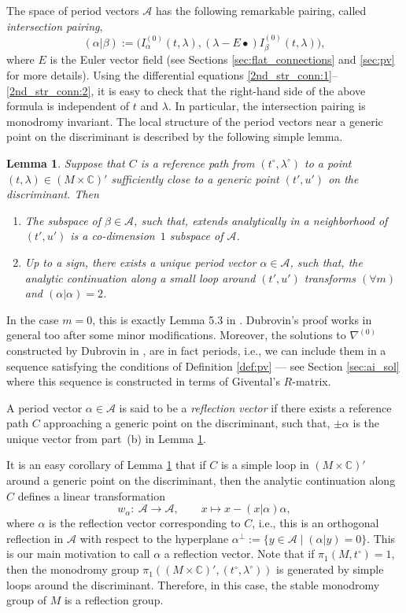 \documentclass[pdftex]{sigma}
\numberwithin{equation}{section}
\newtheorem{Lemma}[Theorem]{Lemma}
\newcommand{\CC}{\mathbb{C}}
\newcommand{\A}{\mathcal{A}}
\begin{document}
The space of period vectors $\A$ has the following remarkable pairing, called {\em intersection pairing},
\[
(\alpha|\beta):=\big(I^{(0)}_\alpha(t,\lambda), (\lambda-E\bullet) I^{(0)}_\beta(t,\lambda)\big),
\]
where $E$ is the Euler vector field (see Sections \ref{sec:flat_connections} and \ref{sec:pv} for more details). Using the differential equations \eqref{2nd_str_conn:1}--\eqref{2nd_str_conn:2}, it is easy to check that the right-hand side of the above formula is independent of $t$ and $\lambda$. In particular, the intersection pairing is monodromy invariant. The local structure of the period vectors near a generic point on the discriminant is described by the following simple lemma.
\begin{Lemma}\label{le:local_mon}
Suppose that $C$ is a reference path from $(t^\circ,\lambda^\circ)$ to a point $(t,\lambda)\in (M\times \CC)'$ sufficiently close to a generic point $(t',u')$ on the discriminant. Then
\begin{enumerate}\itemsep=0pt
\item[$(a)$]
The subspace of $\beta\in \A$, such that,  extends analytically in a neighborhood of~$(t',u')$ is a co-dimension~$1$ subspace of $\A$.
\item[$(b)$]
Up to a sign, there exists a unique period vector $\alpha\in \A$, such
that, the analytic continuation along a small loop around $(t',u')$
transforms  $(\forall m)$ and ${(\alpha|\alpha)=2}$.
\end{enumerate}
\end{Lemma}
In the case $m=0$, this is exactly Lemma 5.3 in
\cite{Dubrovin1999}. Dubrovin's proof works in general too after
some minor modifications. Moreover, the solutions to $\nabla^{(0)}$ constructed by
Dubrovin in \cite[Lemma~5.3]{Dubrovin1999}, are in fact periods, i.e.,
we can include them in a sequence satisfying the conditions of
Definition \ref{def:pv} --- see Section \ref{sec:ai_sol} where this sequence
is constructed in terms of Givental's $R$-matrix.
\begin{Definition}\label{def:rv}
A period vector $\alpha\in \A$ is said to be a {\em reflection vector}
if there exists a reference path $C$ approaching a generic point on
the discriminant, such that, $\pm\alpha$ is the unique vector from
part~(b) in Lemma \ref{le:local_mon}.

\end{Definition}
It is an easy corollary of Lemma \ref{le:local_mon} that if $C$ is a
simple loop in $(M\times \CC)'$ around a generic point on the
discriminant, then the analytic continuation along $C$ defines a
linear transformation
\[
w_\alpha\colon\ \A\to \A, \qquad x\mapsto x-(x|\alpha)\alpha,
\]
where $\alpha$ is the reflection vector corresponding to $C$, i.e.,
this is an orthogonal reflection in $\A$ with respect to the
hyperplane $\alpha^\perp:=\{ y\in \A\mid  (\alpha|y)=0\}$. This is our
main motivation to call $\alpha$ a reflection vector. Note that if
$\pi_1(M,t^\circ)=1$, then the monodromy group $\pi_1((M\times
\CC)',\allowbreak(t^\circ,\lambda^\circ))$ is generated by simple loops around
the discriminant. Therefore, in this case, the stable monodromy group
of $M$ is a reflection group.
\end{document}
